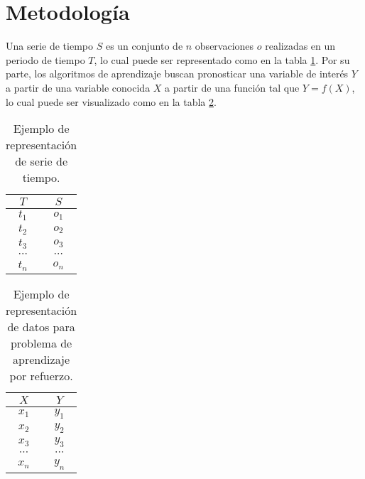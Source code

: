 \section{Metodología}

Una serie de tiempo $S$ es un conjunto de $n$ observaciones $o$ realizadas en un periodo de tiempo $T$, lo cual puede ser representado como en la tabla \ref{tab:timeseries}. Por su parte, los algoritmos de aprendizaje buscan pronosticar una variable de interés $Y$ a partir de una variable conocida $X$ \cite{Lazzeri2021} a partir de una función tal que $Y = f(X)$, lo cual puede ser visualizado como en la tabla \ref{tab:reinforcement}.

\begin{table}
    \begin{center}
        \caption{Ejemplo de representación de serie de tiempo.}
        \label{tab:timeseries}
        \begin{tabular}{| c | c |}
        \hline
        $T$ & $S$ \\ \hline \hline
        $t_1$ & $o_1$ \\ \hline
        $t_2$ & $o_2$ \\ \hline
        $t_3$ & $o_3$ \\ \hline
        $\cdots$ & $\cdots$ \\ \hline
        $t_n$ & $o_n$ \\ \hline
        \end{tabular}
    \end{center}
\end{table}

\begin{table}
    \begin{center}
        \caption{Ejemplo de representación de datos para problema de aprendizaje por refuerzo.}
        \label{tab:reinforcement}
        \begin{tabular}{| c | c |}
        \hline
        $X$ & $Y$ \\ \hline \hline
        $x_1$ & $y_1$ \\ \hline
        $x_2$ & $y_2$ \\ \hline
        $x_3$ & $y_3$ \\ \hline
        $\cdots$ & $\cdots$ \\ \hline
        $x_n$ & $y_n$ \\ \hline
        \end{tabular}
    \end{center}
\end{table}

